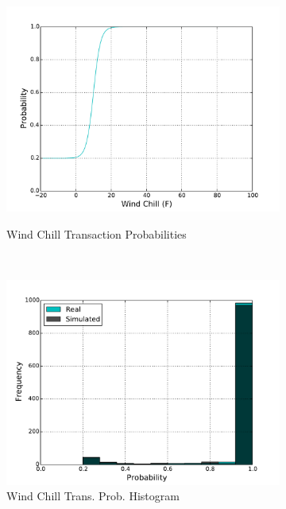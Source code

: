 \documentclass[11pt, letterpaper]{article}
\begin{document}
\begin{figure}[H]
  \centering
  \begin{subfigure}[b]{0.45\textwidth}
    \includegraphics[width=\textwidth]{figures/wind_chill_trans_prob.pdf}
    \label{fig:analysis-raw}
    \caption{Wind Chill Transaction Probabilities}
  \end{subfigure}
  ~
  \begin{subfigure}[b]{0.45\textwidth}
    \includegraphics[width=\textwidth]{figures/wind_chill_trans_prob_hist.pdf}
    \caption{Wind Chill Trans. Prob. Histogram}
  \end{subfigure}
  ~
  \begin{subfigure}[b]{0.45\textwidth}

\end{subfigure}
\end{figure}
\end{document}
